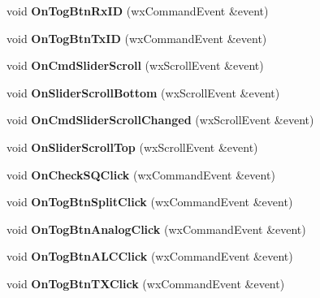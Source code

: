 \begin{DoxyCompactItemize}
\item 
\hypertarget{classfdmdv2_top_frame_a8a4932e438bc43216c1758b2b743999d}{void {\bfseries On\-Tog\-Btn\-Rx\-I\-D} (wx\-Command\-Event \&event)}\label{classfdmdv2_top_frame_a8a4932e438bc43216c1758b2b743999d}

\item 
\hypertarget{classfdmdv2_top_frame_a5019137fb2394fcbf752ef3fd93ab34e}{void {\bfseries On\-Tog\-Btn\-Tx\-I\-D} (wx\-Command\-Event \&event)}\label{classfdmdv2_top_frame_a5019137fb2394fcbf752ef3fd93ab34e}

\item 
\hypertarget{classfdmdv2_top_frame_af289ab4037653c543a3fc6013fb1557c}{void {\bfseries On\-Cmd\-Slider\-Scroll} (wx\-Scroll\-Event \&event)}\label{classfdmdv2_top_frame_af289ab4037653c543a3fc6013fb1557c}

\item 
\hypertarget{classfdmdv2_top_frame_a80eed826553b3b9bd0b5abf0e8bd873e}{void {\bfseries On\-Slider\-Scroll\-Bottom} (wx\-Scroll\-Event \&event)}\label{classfdmdv2_top_frame_a80eed826553b3b9bd0b5abf0e8bd873e}

\item 
\hypertarget{classfdmdv2_top_frame_a2a9e3791fee37e151c3ec8dc1282cd9f}{void {\bfseries On\-Cmd\-Slider\-Scroll\-Changed} (wx\-Scroll\-Event \&event)}\label{classfdmdv2_top_frame_a2a9e3791fee37e151c3ec8dc1282cd9f}

\item 
\hypertarget{classfdmdv2_top_frame_aab79b33c4b93e9dd53ad5504c9adb9de}{void {\bfseries On\-Slider\-Scroll\-Top} (wx\-Scroll\-Event \&event)}\label{classfdmdv2_top_frame_aab79b33c4b93e9dd53ad5504c9adb9de}

\item 
\hypertarget{classfdmdv2_top_frame_a117d1df5645785732cec78f16f7988de}{void {\bfseries On\-Check\-S\-Q\-Click} (wx\-Command\-Event \&event)}\label{classfdmdv2_top_frame_a117d1df5645785732cec78f16f7988de}

\item 
\hypertarget{classfdmdv2_top_frame_aad23421c7ed54e19319de0e1dc1588e5}{void {\bfseries On\-Tog\-Btn\-Split\-Click} (wx\-Command\-Event \&event)}\label{classfdmdv2_top_frame_aad23421c7ed54e19319de0e1dc1588e5}

\item 
\hypertarget{classfdmdv2_top_frame_af0d8da60f6d22ea57f67b4312beff8c9}{void {\bfseries On\-Tog\-Btn\-Analog\-Click} (wx\-Command\-Event \&event)}\label{classfdmdv2_top_frame_af0d8da60f6d22ea57f67b4312beff8c9}

\item 
\hypertarget{classfdmdv2_top_frame_afe6f710b0e59ab7cc90f5198b118dbcd}{void {\bfseries On\-Tog\-Btn\-A\-L\-C\-Click} (wx\-Command\-Event \&event)}\label{classfdmdv2_top_frame_afe6f710b0e59ab7cc90f5198b118dbcd}

\item 
\hypertarget{classfdmdv2_top_frame_aa7cd279560fb011e7f8d79cdc104248d}{void {\bfseries On\-Tog\-Btn\-T\-X\-Click} (wx\-Command\-Event \&event)}\label{classfdmdv2_top_frame_aa7cd279560fb011e7f8d79cdc104248d}

\end{DoxyCompactItemize}
